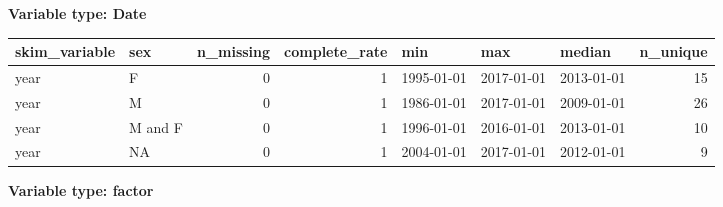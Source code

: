 \documentclass[
]{article}
\begin{document}
\textbf{Variable type: Date}

\begin{longtable}[]{@{}llrrlllr@{}}
\toprule
skim\_variable & sex & n\_missing & complete\_rate & min & max & median
& n\_unique \\
\midrule
\endhead
year & F & 0 & 1 & 1995-01-01 & 2017-01-01 & 2013-01-01 & 15 \\
year & M & 0 & 1 & 1986-01-01 & 2017-01-01 & 2009-01-01 & 26 \\
year & M and F & 0 & 1 & 1996-01-01 & 2016-01-01 & 2013-01-01 & 10 \\
year & NA & 0 & 1 & 2004-01-01 & 2017-01-01 & 2012-01-01 & 9 \\
\bottomrule
\end{longtable}

\textbf{Variable type: factor}
\end{document}
